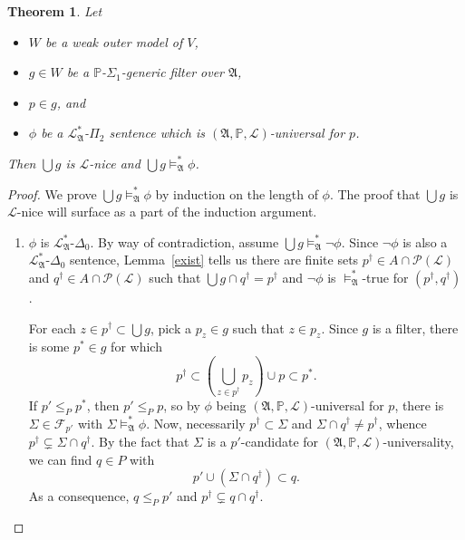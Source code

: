 \documentclass[12pt, twoside]{memoir}
\numberwithin{equation}{section}
\newtheorem{thm}{Theorem}[section]
\theoremstyle{definition}
\theoremstyle{remark}
\theoremstyle{definition}
\theoremstyle{definition}
\theoremstyle{definition}
\theoremstyle{remark}
\begin{document}
\begin{thm}\label{uni}
Let 
\begin{itemize} 
    \item $W$ be a weak outer model of $V$,
    \item $g \in W$ be a $\mathbb{P}$-$\Sigma_1$-generic filter over $\mathfrak{A}$,
    \item $p \in g$, and
    \item $\phi$ be a $\mathcal{L}^{*}_{\mathfrak{A}}$-$\Pi_2$ sentence which is $(\mathfrak{A}, \mathbb{P}, \mathcal{L})$-universal for $p$.
\end{itemize} 
Then $\bigcup g$ is $\mathcal{L}$-nice and $\bigcup g \models^{*}_{\mathfrak{A}} \phi$.
\end{thm}
\begin{proof}
We prove $\bigcup g \models^{*}_{\mathfrak{A}} \phi$ by induction on the length of $\phi$. The proof that $\bigcup g$ is $\mathcal{L}$-nice will surface as a part of the induction argument.
\begin{enumerate}[label=Case \arabic*:, leftmargin=50pt]
    \item $\phi$ is $\mathcal{L}^{*}_{\mathfrak{A}}$-$\Delta_0$. By way of contradiction, assume $\bigcup g \models^{*}_{\mathfrak{A}} \neg \phi$. Since $\neg \phi$ is also a $\mathcal{L}^{*}_{\mathfrak{A}}$-$\Delta_0$ sentence, Lemma~\ref{exist} tells us there are finite sets $p^{\dagger} \in A \cap \mathcal{P}(\mathcal{L})$ and $q^{\dagger} \in A \cap \mathcal{P}(\mathcal{L})$ such that $\bigcup g \cap q^{\dagger} = p^{\dagger}$ and $\neg \phi$ is $\models^{*}_{\mathfrak{A}}$-true for $(p^{\dagger}, q^{\dagger})$.

    For each $z \in p^{\dagger} \subset \bigcup g$, pick a $p_z \in g$ such that $z \in p_z$. Since $g$ is a filter, there is some $p^* \in g$ for which $$p^{\dagger} \subset (\bigcup_{z \in p^{\dagger}} p_z) \cup p \subset p^*.$$ If $p' \leq_{P} p^*$, then $p' \leq_{P} p$, so by $\phi$ being $(\mathfrak{A}, \mathbb{P}, \mathcal{L})$-universal for $p$, there is $\Sigma \in \mathcal{F}_{p'}$ with $\Sigma \models^*_{\mathfrak{A}} \phi$. Now, necessarily $p^{\dagger} \subset \Sigma$ and $\Sigma \cap q^{\dagger} \neq p^{\dagger}$, whence $p^{\dagger} \subsetneq \Sigma \cap q^{\dagger}$. By the fact that $\Sigma$ is a $p'$-candidate for $(\mathfrak{A}, \mathbb{P}, \mathcal{L})$-universality, we can find $q \in P$ with $$p' \cup (\Sigma \cap q^{\dagger}) \subset q.$$ As a consequence, $q \leq_P p'$ and $p^{\dagger} \subsetneq q \cap q^{\dagger}$.
    

\end{enumerate}
\end{proof}
\end{document}

